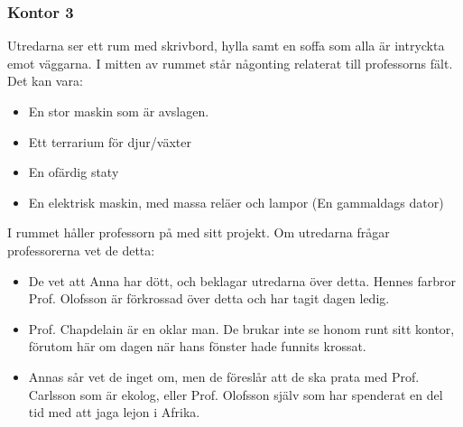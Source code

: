 \subsubsection*{Kontor 3}
Utredarna ser ett rum med skrivbord, hylla samt en soffa som alla är intryckta emot väggarna. I mitten av rummet står någonting relaterat till professorns fält. Det kan vara:
%
\begin{itemize}
	\item En stor maskin som är avslagen.
	\item Ett terrarium för djur/växter
	\item En ofärdig staty
	\item En elektrisk maskin, med massa reläer och lampor (En gammaldags dator)
\end{itemize}
%
I rummet håller professorn på med sitt projekt. Om utredarna frågar professorerna vet de detta:
%
\begin{itemize}
	\item De vet att Anna har dött, och beklagar utredarna över detta. Hennes farbror Prof. Olofsson är förkrossad över detta och har tagit dagen ledig.
	\item Prof. Chapdelain är en oklar man. De brukar inte se honom runt sitt kontor, förutom här om dagen när hans fönster hade funnits krossat.
	\item Annas sår vet de inget om, men de föreslår att de ska prata med Prof. Carlsson som är ekolog, eller Prof. Olofsson själv som har spenderat en del tid med att jaga lejon i Afrika.
\end{itemize}
